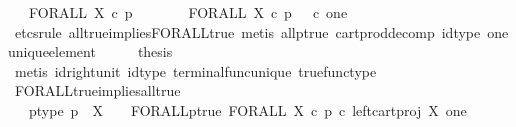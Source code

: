 \begin{isabellebody}
\ \ \ {\isachardoublequoteopen}FORALL\ X\ {\isasymcirc}\isactrlsub c\ p\isactrlsup {\isasymsharp}\ {\isacharequal}{\kern0pt}\ {\isasymt}{\isachardoublequoteclose}\isanewline
%
\isadelimproof
%
\endisadelimproof
%
\isatagproof
{}\isamarkupfalse%
\ {\isacharminus}{\kern0pt}\isanewline
\ \ \isamarkupfalse%
\ {\isachardoublequoteopen}FORALL\ X\ {\isasymcirc}\isactrlsub c\ p\isactrlsup {\isasymsharp}\ {\isacharequal}{\kern0pt}\ {\isasymt}\ {\isasymcirc}\isactrlsub c\ {\isasymbeta}\isactrlbsub one\isactrlesub {\isachardoublequoteclose}\isanewline
\ \ \ \ \isamarkupfalse%
\ {\isacharparenleft}{\kern0pt}etcs{\isacharunderscore}{\kern0pt}rule\ all{\isacharunderscore}{\kern0pt}true{\isacharunderscore}{\kern0pt}implies{\isacharunderscore}{\kern0pt}FORALL{\isacharunderscore}{\kern0pt}true{}{\isacharcomma}{\kern0pt}\ metis\ all{\isacharunderscore}{\kern0pt}p{\isacharunderscore}{\kern0pt}true\ cart{\isacharunderscore}{\kern0pt}prod{\isacharunderscore}{\kern0pt}decomp\ id{\isacharunderscore}{\kern0pt}type\ one{\isacharunderscore}{\kern0pt}unique{\isacharunderscore}{\kern0pt}element{\isacharparenright}{\kern0pt}\isanewline
\ \ \isamarkupfalse%
\ \isamarkupfalse%
\ {\isacharquery}{\kern0pt}thesis\isanewline
\ \ \ \ \isamarkupfalse%
\ {\isacharparenleft}{\kern0pt}metis\ id{\isacharunderscore}{\kern0pt}right{\isacharunderscore}{\kern0pt}unit{}\ id{\isacharunderscore}{\kern0pt}type\ terminal{\isacharunderscore}{\kern0pt}func{\isacharunderscore}{\kern0pt}unique\ true{\isacharunderscore}{\kern0pt}func{\isacharunderscore}{\kern0pt}type{\isacharparenright}{\kern0pt}\isanewline
{}\isamarkupfalse%
%
\endisatagproof
{\isafoldproof}%
%
\isadelimproof
\isanewline
%
\endisadelimproof
\isanewline
{}\isamarkupfalse%
\ FORALL{\isacharunderscore}{\kern0pt}true{\isacharunderscore}{\kern0pt}implies{\isacharunderscore}{\kern0pt}all{\isacharunderscore}{\kern0pt}true{\isacharcolon}{\kern0pt}\isanewline
\ \ \ p{\isacharunderscore}{\kern0pt}type{\isacharcolon}{\kern0pt}\ {\isachardoublequoteopen}p\ {\isacharcolon}{\kern0pt}\ X\ {\isasymrightarrow}\ {\isasymOmega}{\isachardoublequoteclose}\ \ FORALL{\isacharunderscore}{\kern0pt}p{\isacharunderscore}{\kern0pt}true{\isacharcolon}{\kern0pt}\ {\isachardoublequoteopen}FORALL\ X\ {\isasymcirc}\isactrlsub c\ {\isacharparenleft}{\kern0pt}p\ {\isasymcirc}\isactrlsub c\ left{\isacharunderscore}{\kern0pt}cart{\isacharunderscore}{\kern0pt}proj\ X\ one{\isacharparenright}{\kern0pt}\isactrlsup {\isasymsharp}\ {\isacharequal}{\kern0pt}\ {\isasymt}{\isachardoublequoteclose}\isanewline

\end{isabellebody}
